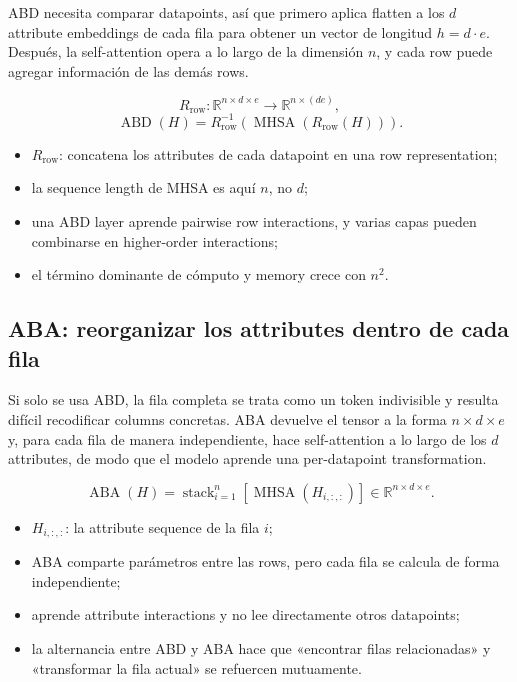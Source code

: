 ABD necesita comparar datapoints, así que primero aplica flatten a los $d$ attribute embeddings de cada fila para obtener un vector de longitud $h=d\cdot e$. Después, la self-attention opera a lo largo de la dimensión $n$, y cada row puede agregar información de las demás rows.


\[
R_{\mathrm{row}}:
\mathbb{R}^{n\times d\times e}\rightarrow
\mathbb{R}^{n\times (de)},
\]
\[
\operatorname{ABD}(H)
=R_{\mathrm{row}}^{-1}\!\left(
\operatorname{MHSA}(R_{\mathrm{row}}(H))
\right).
\]

\begin{itemize}
  \item $R_{\mathrm{row}}$: concatena los attributes de cada datapoint en una row representation;
  \item la sequence length de MHSA es aquí $n$, no $d$;
  \item una ABD layer aprende pairwise row interactions, y varias capas pueden combinarse en higher-order interactions;
  \item el término dominante de cómputo y memory crece con $n^2$.
\end{itemize}

\subsection{ABA: reorganizar los attributes dentro de cada fila}

Si solo se usa ABD, la fila completa se trata como un token indivisible y resulta difícil recodificar columns concretas. ABA devuelve el tensor a la forma $n\times d\times e$ y, para cada fila de manera independiente, hace self-attention a lo largo de los $d$ attributes, de modo que el modelo aprende una per-datapoint transformation.

\[
\operatorname{ABA}(H)
=\operatorname{stack}_{i=1}^{n}
\left[\operatorname{MHSA}(H_{i,:,:})\right]
\in\mathbb{R}^{n\times d\times e}.
\]

\begin{itemize}
  \item $H_{i,:,:}$: la attribute sequence de la fila $i$;
  \item ABA comparte parámetros entre las rows, pero cada fila se calcula de forma independiente;
  \item aprende attribute interactions y no lee directamente otros datapoints;
  \item la alternancia entre ABD y ABA hace que «encontrar filas relacionadas» y «transformar la fila actual» se refuercen mutuamente.
\end{itemize}

